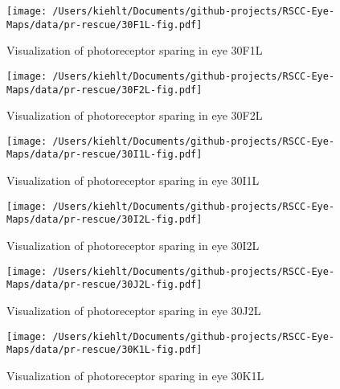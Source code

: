 \documentclass{article}
\begin{document}
\begin{center}
\begin{figure}
\texttt{[image: /Users/kiehlt/Documents/github-projects/RSCC-Eye-Maps/data/pr-rescue/30F1L-fig.pdf]}
\caption{Visualization of photoreceptor sparing in eye 30F1L}
\label{fig:30F1L}
\end{figure}

\end{center}
\begin{center}
\begin{figure}
\texttt{[image: /Users/kiehlt/Documents/github-projects/RSCC-Eye-Maps/data/pr-rescue/30F2L-fig.pdf]}
\caption{Visualization of photoreceptor sparing in eye 30F2L}
\label{fig:30F2L}
\end{figure}

\end{center}
\begin{center}
\begin{figure}
\texttt{[image: /Users/kiehlt/Documents/github-projects/RSCC-Eye-Maps/data/pr-rescue/30I1L-fig.pdf]}
\caption{Visualization of photoreceptor sparing in eye 30I1L}
\label{fig:30I1L}
\end{figure}

\end{center}
\begin{center}
\begin{figure}
\texttt{[image: /Users/kiehlt/Documents/github-projects/RSCC-Eye-Maps/data/pr-rescue/30I2L-fig.pdf]}
\caption{Visualization of photoreceptor sparing in eye 30I2L}
\label{fig:30I2L}
\end{figure}

\end{center}
\begin{center}
\begin{figure}
\texttt{[image: /Users/kiehlt/Documents/github-projects/RSCC-Eye-Maps/data/pr-rescue/30J2L-fig.pdf]}
\caption{Visualization of photoreceptor sparing in eye 30J2L}
\label{fig:30J2L}
\end{figure}

\end{center}
\begin{center}
\begin{figure}
\texttt{[image: /Users/kiehlt/Documents/github-projects/RSCC-Eye-Maps/data/pr-rescue/30K1L-fig.pdf]}
\caption{Visualization of photoreceptor sparing in eye 30K1L}
\label{fig:30K1L}
\end{figure}

\end{center}
\end{document}
